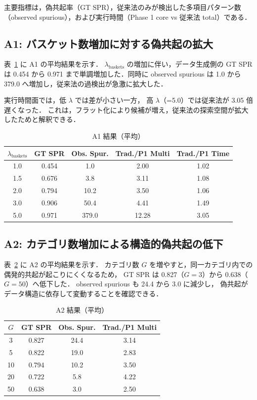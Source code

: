 主要指標は，偽共起率（GT SPR），従来法のみが検出した多項目パターン数
（observed spurious），および実行時間（Phase 1 core vs 従来法 total）である．

\subsection{A1: バスケット数増加に対する偽共起の拡大}
\label{sec:exp_a1}

表~\ref{tab:a1_summary} に A1 の平均結果を示す．
$\lambda_{\text{baskets}}$ の増加に伴い，データ生成側の GT SPR は
0.454 から 0.971 まで単調増加した．同時に observed spurious は
1.0 から 379.0 へ増加し，従来法の過検出が急激に拡大した．

実行時間面では，低 $\lambda$ では差が小さい一方，
高 $\lambda$（=5.0）では従来法が 3.05 倍遅くなった．
これは，フラット化により候補が増え，従来法の探索空間が拡大したためと解釈できる．

\begin{table}[t]
\caption{A1 結果（平均）}
\label{tab:a1_summary}
\centering
\begin{tabular}{ccccc}
\toprule
$\lambda_{\text{baskets}}$ & GT SPR & Obs. Spur. & Trad./P1 Multi & Trad./P1 Time \\
\midrule
1.0 & 0.454 & 1.0   & 2.00 & 1.02 \\
1.5 & 0.676 & 3.8   & 3.11 & 1.08 \\
2.0 & 0.794 & 10.2  & 3.50 & 1.06 \\
3.0 & 0.906 & 50.4  & 4.41 & 1.49 \\
5.0 & 0.971 & 379.0 & 12.28 & 3.05 \\
\bottomrule
\end{tabular}
\end{table}

\subsection{A2: カテゴリ数増加による構造的偽共起の低下}
\label{sec:exp_a2}

表~\ref{tab:a2_summary} に A2 の平均結果を示す．
カテゴリ数 $G$ を増やすと，同一カテゴリ内での偶発的共起が起こりにくくなるため，
GT SPR は 0.827（$G=3$）から 0.638（$G=50$）へ低下した．
observed spurious も 24.4 から 3.0 に減少し，
偽共起がデータ構造に依存して変動することを確認できる．

\begin{table}[t]
\caption{A2 結果（平均）}
\label{tab:a2_summary}
\centering
\begin{tabular}{cccc}
\toprule
$G$ & GT SPR & Obs. Spur. & Trad./P1 Multi \\
\midrule
3  & 0.827 & 24.4 & 3.14 \\
5  & 0.822 & 19.0 & 2.83 \\
10 & 0.794 & 10.2 & 3.50 \\
20 & 0.722 & 5.8  & 4.22 \\
50 & 0.638 & 3.0  & 2.50 \\
\bottomrule
\end{tabular}
\end{table}

